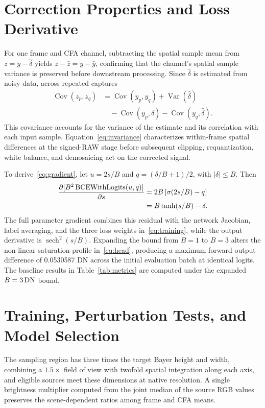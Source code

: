 \section{Correction Properties and Loss Derivative}
\label{app:math}
For one frame and CFA channel, subtracting the spatial sample mean from $z=y-\hat\delta$ yields $z-\bar z=y-\bar y$, confirming that the channel's spatial sample variance is preserved before downstream processing. Since $\hat\delta$ is estimated from noisy data, across repeated captures
\begin{align}
 \operatorname{Cov}(z_p,z_q)
 &=\operatorname{Cov}(y_p,y_q)+\operatorname{Var}(\hat\delta)\nonumber\\
 &\quad-\operatorname{Cov}(y_p,\hat\delta)
       -\operatorname{Cov}(y_q,\hat\delta).
\end{align}
This covariance accounts for the variance of the estimate and its correlation with each input sample. Equation~\eqref{eq:invariance} characterizes within-frame spatial differences at the signed-RAW stage before subsequent clipping, requantization, white balance, and demosaicing act on the corrected signal.

To derive~\eqref{eq:gradient}, let $u=2s/B$ and $q=(\delta/B+1)/2$, with $|\delta|\le B$. Then
\begin{align}
 \frac{\partial[B^2\operatorname{BCEWithLogits}(u,q)]}{\partial s}
 &=2B\left[\sigma(2s/B)-q\right]\nonumber\\
 &=B\tanh(s/B)-\delta.
\end{align}
The full parameter gradient combines this residual with the network Jacobian, label averaging, and the three loss weights in~\eqref{eq:training}, while the output derivative is $\operatorname{sech}^2(s/B)$. Expanding the bound from $B=1$ to $B=3$ alters the non-linear saturation profile in~\eqref{eq:head}, producing a maximum forward output difference of 0.0530587 DN across the initial evaluation batch at identical logits. The baseline results in Table~\ref{tab:metrics} are computed under the expanded $B=3\,\mathrm{DN}$ bound.

\section{Training, Perturbation Tests, and Model Selection}
\label{app:protocol}
The sampling region has three times the target Bayer height and width, combining a $1.5\times$ field of view with twofold spatial integration along each axis, and eligible sources meet these dimensions at native resolution. A single brightness multiplier computed from the joint median of the source RGB values preserves the scene-dependent ratios among frame and CFA means.

